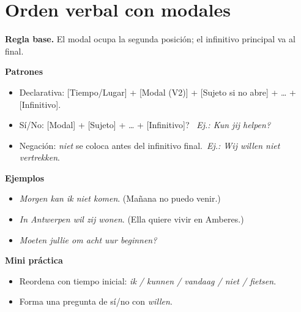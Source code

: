 \section{Orden verbal con modales}
\textbf{Regla base.} El modal ocupa la segunda posición; el infinitivo principal va al final.

\textbf{Patrones}
\begin{itemize}[leftmargin=*]
  \item Declarativa: [Tiempo/Lugar] + [Modal (V2)] + [Sujeto si no abre] + \ldots{} + [Infinitivo].
  \item Sí/No: [Modal] + [Sujeto] + \ldots{} + [Infinitivo]? \ \textit{Ej.: Kun jij helpen?}
  \item Negación: \textit{niet} se coloca antes del infinitivo final.\ \textit{Ej.: Wij willen niet vertrekken}.
\end{itemize}

\textbf{Ejemplos}
\begin{itemize}[leftmargin=*]
  \item \textit{Morgen kan ik niet komen}. (Mañana no puedo venir.)
  \item \textit{In Antwerpen wil zij wonen}. (Ella quiere vivir en Amberes.)
  \item \textit{Moeten jullie om acht uur beginnen?}
\end{itemize}

\textbf{Mini práctica}
\begin{itemize}[leftmargin=*]
  \item Reordena con tiempo inicial: \textit{ik / kunnen / vandaag / niet / fietsen}.
  \item Forma una pregunta de sí/no con \textit{willen}.
\end{itemize}
